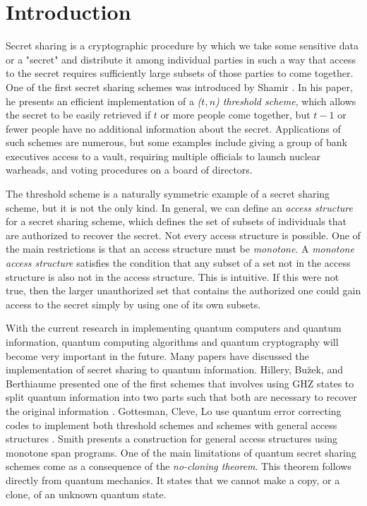 \chapter{Introduction}

Secret sharing is a cryptographic procedure by which we take some sensitive data or a "secret" and distribute it among individual parties in such a way that access to the secret requires sufficiently large subsets of those parties to come together. One of the first secret sharing schemes was introduced by Shamir \cite{shamir}. In his paper, he presents an efficient implementation of a \textit{($t,n$) threshold scheme}, which allows the secret to be easily retrieved if $t$ or more people come together, but $t-1$ or fewer people have no additional information about the secret. Applications of such schemes are numerous, but some examples include giving a group of bank executives  access to a vault, requiring multiple officials to launch nuclear warheads, and voting procedures on a board of directors.

The threshold scheme is a naturally symmetric example of a secret sharing scheme, but it is not the only kind. In general, we can define an \textit{access structure} for a secret sharing scheme, which defines the set of subsets of individuals that are authorized to recover the secret. Not every access structure is possible. One of the main restrictions is that an access structure must be \textit{monotone}. A \textit{monotone access structure} satisfies the condition that any subset of a set not in the access structure is also not in the access structure. This is intuitive. If this were not true, then the larger unauthorized set that contains the authorized one could gain access to the secret simply by using one of its own subsets. 

With the current research in implementing quantum computers and quantum information, quantum computing algorithms and quantum cryptography will become very important in the future. Many papers have discussed the implementation of secret sharing to quantum information. Hillery, Bu\u{z}ek, and Berthiaume presented one of the first schemes that involves using GHZ states to split quantum information into two parts such that both are necessary to recover the original information \cite{Hillery_1999}. Gottesman, Cleve, Lo use quantum error correcting codes to implement both threshold schemes and schemes with general access structures \cite{Cleve_1999}. Smith presents a construction for general access structures using monotone span programs. One of the main limitations of quantum secret sharing schemes come as a consequence of the \textit{no-cloning theorem}. This theorem follows directly from quantum mechanics. It states that we cannot make a copy, or a clone, of an unknown quantum state. 

